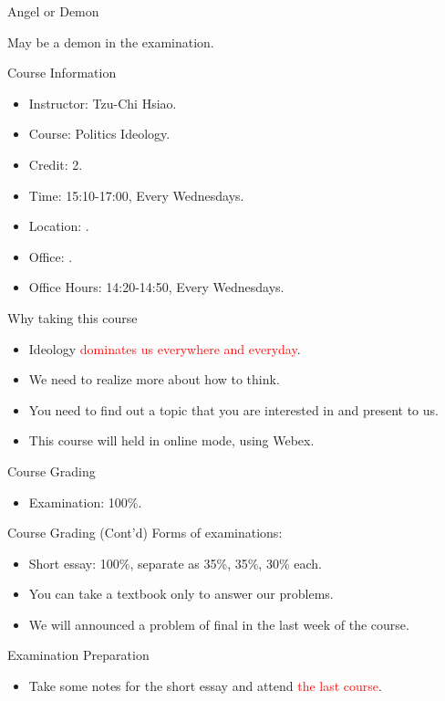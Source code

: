 \documentclass{beamer}
\begin{document}
\begin{frame}{Angel or Demon}
\begin{minipage}{0.4\textwidth}
\begin{center}
\end{center}
\begin{center}
May be a demon in the examination.
\end{center}
\end{minipage}
\end{frame}
\begin{frame}{Course Information}
\begin{itemize}
\item Instructor: Tzu-Chi Hsiao.
\item Course: Politics Ideology.
\item Credit: 2.
\item Time: 15:10-17:00, Every Wednesdays.
\item Location: . 
\item Office: .
\item Office Hours: 14:20-14:50, Every Wednesdays.
\end{itemize}
\end{frame}
\begin{frame}{Why taking this course}
\begin{itemize}
\item Ideology \textcolor{red}{dominates us everywhere and everyday}.
\item We need to realize more about how to think.
\item You need to find out a topic that you are interested in and present to us.
\item This course will held in online mode, using Webex.
\end{itemize}
\end{frame}
\begin{frame}{Course Grading}
\begin{itemize}
\item Examination: 100\%.
\end{itemize}
\end{frame}
\begin{frame}{Course Grading (Cont'd)}
Forms of examinations:
\begin{itemize}
\item Short essay: 100\%, separate as 35\%, 35\%, 30\% each.
\item You can take a textbook only to answer our problems.
\item We will announced a problem of final in the last week of the course.
\end{itemize}
\end{frame}
\begin{frame}{Examination Preparation}
\begin{itemize}
\item Take some notes for the short essay and attend \textcolor{red}{the last course}.
\end{itemize}
\end{frame}
\end{document}
